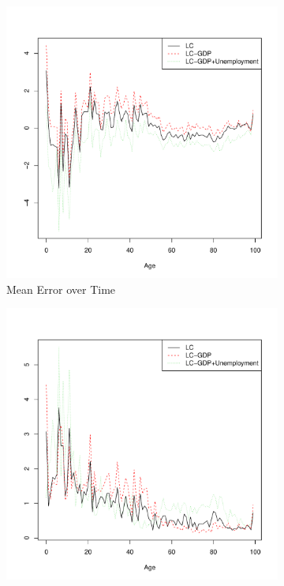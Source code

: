\documentclass[AER, draftmode]{AEA}
\begin{document}
\begin{figure}[!htp]
	\begin{subfigure}{0.4\textwidth}
		\includegraphics[width=\linewidth]{CAN_pred_error_age_female} 
		\caption{Mean Error over Time}
	\end{subfigure}
	\begin{subfigure}{0.4\textwidth}
		\includegraphics[width=\linewidth]{CAN_abs_pred_error_age_female} 

\end{subfigure}
\end{figure}
\end{document}
